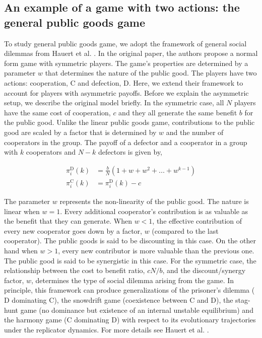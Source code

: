 \documentclass[11pt]{article}
\theoremstyle{plainCl1}
\theoremstyle{plainCl2}
\newcommand{\C}{\mathrm{C}}
\newcommand{\D}{\mathrm{D}}
\begin{document}
\subsection*{An example of a  game with two actions: the general public goods game}

To study general public goods game, we adopt the framework of general social dilemmas from Hauert et al. \cite{Hauert:JTB:2006a}. In the original paper, the authors propose a normal form game with symmetric players. The game's properties are determined by a parameter $w$ that determines the nature of the public good. The players have two actions: cooperation, $\C$ and defection, $\D$. Here, we extend their framework to account for players with asymmetric payoffs. Before we explain the asymmetric setup, we describe the original model briefly. In the symmetric case, all $N$ players have the same cost of cooperation, $c$ and they all generate the same benefit $b$ for the public good. Unlike the linear public goods game, contributions to the public good are scaled by a factor that is determined by $w$ and the number of cooperators in the group. The payoff of a defector and a cooperator in a group with $k$ cooperators and $N-k$ defectors is given by, 

\begin{align}
\pi^{\D}_i(k) &= \frac{b}{N}(1 + w + w^2 + ... + w^{k-1}) \\[15pt]
\pi^{\C}_i(k) &= \pi^{\D}_i(k) - c
\label{Eq:payoff-synergistic-symmetric}
\end{align} 

\noindent The parameter $w$ represents the non-linearity of the public good. The nature is linear when $w = 1$. Every additional cooperator's contribution is as valuable as the benefit that they can generate. When $w < 1$, the effective contribution of every new cooperator goes down by a factor, $w$ (compared to the last cooperator). The public goods is said to be discounting in this case. On the other hand when $w > 1$, every new contributor is more valuable than the previous one. The public good is said to be synergistic in this case. For the symmetric case, the relationship between the cost to benefit ratio, $cN/b$, and the discount/synergy factor, $w$, determines the type of social dilemma arising from the game. In principle, this framework can produce generalizations of the prisoner's dilemma ($\D$ dominating $\C$), the snowdrift game (coexistence between $\C$ and $\D$), the stag-hunt game (no dominance but existence of an internal unstable equilibrium) and the harmony game ($\C$ dominating $\D$) with respect to its evolutionary trajectories under the replicator dynamics. For more details see Hauert et al. \cite{Hauert:JTB:2006a}. \\ 
\end{document}

